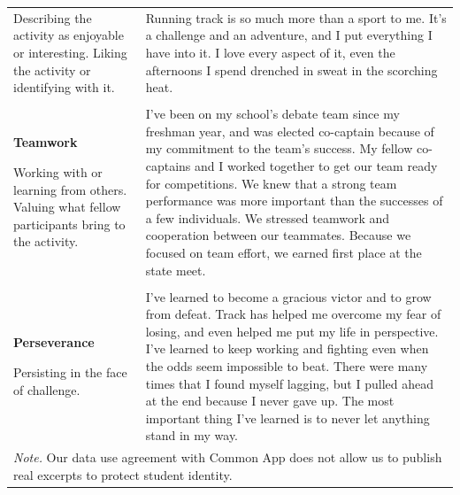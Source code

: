 \documentclass[11pt]{report}
\begin{document}
\begin{mainf}
\begin{table}[ht]
\begin{tabular}{  p{.275\linewidth}  p{.675\linewidth}}
Describing the activity as enjoyable or interesting. Liking the activity or identifying with it.                                                                                         & Running track is so much more than a sport to me. It’s a challenge and an adventure, and I put everything I have into it. I love every aspect of it, even the afternoons I spend drenched in sweat in the scorching heat.                                                                                                                                                                                                                 \\ \\
\textbf{Teamwork}

Working with or learning from others. Valuing what fellow participants bring to the activity.                                                                                            & I’ve been on my school’s debate team since my freshman year, and was elected co-captain because of my commitment to the team’s success. My fellow co-captains and I worked together to get our team ready for competitions. We knew that a strong team performance was more important than the successes of a few individuals. We stressed teamwork and cooperation between our teammates. Because we focused on team effort, we earned first place at the state meet.             \\ \\
\textbf{Perseverance}

Persisting in the face of challenge.                                                                                                                                                      & I’ve learned to become a gracious victor and to grow from defeat. Track has helped me overcome my fear of losing, and even helped me put my life in perspective. I’ve learned to keep working and fighting even when the odds seem impossible to beat. There were many times that I found myself lagging, but I pulled ahead at the end because I never gave up. The most important thing I’ve learned is to never let anything stand in my way.     \\                         \hline    
\multicolumn{2}{l}{\textit{Note.} Our data use agreement with Common App does not allow us to publish real excerpts to protect student identity.}
\end{tabular}
\label{tab:pqs}

\end{table}


\end{mainf}
\end{document}
